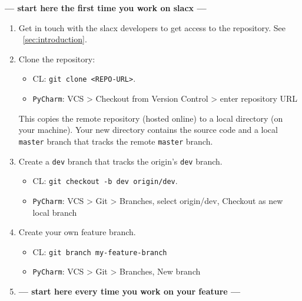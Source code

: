 \textbf{--- start here the first time you work on slacx ---} 
\begin{enumerate} 
    \item Get in touch with the slacx developers to get access to the repository. 
        See ~\ref{sec:introduction}.
    \item Clone the repository: 
    \begin{itemize} 
        \item CL: \verb|git clone <REPO-URL>|. 
        \item \verb|PyCharm|: VCS > Checkout from Version Control > enter repository URL
    \end{itemize} 
    This copies the remote repository (hosted online)
    to a local directory (on your machine). 
    Your new directory contains the source code
    and a local \verb|master| branch 
    that tracks the remote \verb|master| branch.
    \item Create a \verb|dev| branch that tracks the origin's \verb|dev| branch.
    \begin{itemize} 
        \item CL: \verb|git checkout -b dev origin/dev|. 
        \item \verb|PyCharm|: VCS > Git > Branches, select origin/dev, Checkout as new local branch 
    \end{itemize} 
    \item Create your own feature branch. 
    \label{itm:init_laststep}
    \begin{itemize} 
        \item CL: \verb|git branch my-feature-branch| 
        \item \verb|PyCharm|: VCS > Git > Branches, New branch
    \end{itemize} 
    \item \textbf{--- start here every time you work on your feature ---}

\end{enumerate}
